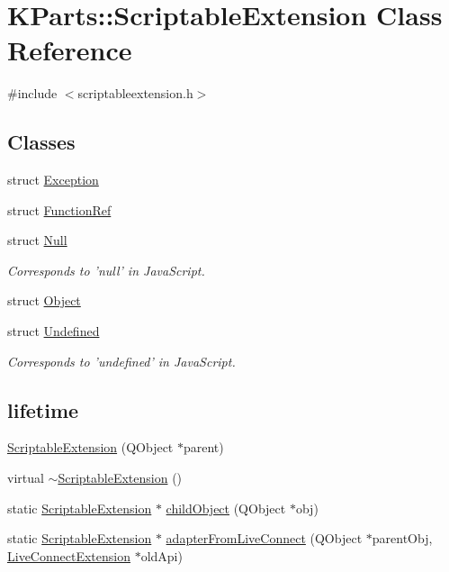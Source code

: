 \hypertarget{classKParts_1_1ScriptableExtension}{\section{\-K\-Parts\-:\-:\-Scriptable\-Extension \-Class \-Reference}
\label{classKParts_1_1ScriptableExtension}
}


{\ttfamily \#include $<$scriptableextension.\-h$>$}

\subsection*{\-Classes}
\begin{DoxyCompactItemize}
\item 
struct \hyperlink{structKParts_1_1ScriptableExtension_1_1Exception}{\-Exception}
\item 
struct \hyperlink{structKParts_1_1ScriptableExtension_1_1FunctionRef}{\-Function\-Ref}
\item 
struct \hyperlink{structKParts_1_1ScriptableExtension_1_1Null}{\-Null}
\begin{DoxyCompactList}\small\item\em \-Corresponds to 'null' in \-Java\-Script. \end{DoxyCompactList}\item 
struct \hyperlink{structKParts_1_1ScriptableExtension_1_1Object}{\-Object}
\item 
struct \hyperlink{structKParts_1_1ScriptableExtension_1_1Undefined}{\-Undefined}
\begin{DoxyCompactList}\small\item\em \-Corresponds to 'undefined' in \-Java\-Script. \end{DoxyCompactList}\end{DoxyCompactItemize}
\subsection*{lifetime}
\begin{DoxyCompactItemize}
\item 
\hyperlink{classKParts_1_1ScriptableExtension_ab5aa7a70fe1b0643b5498529e574ef76}{\-Scriptable\-Extension} (\-Q\-Object $\ast$parent)
\item 
virtual \hyperlink{classKParts_1_1ScriptableExtension_aea7c940a43c9fba7279bc4d3a1959407}{$\sim$\-Scriptable\-Extension} ()
\item 
static \hyperlink{classKParts_1_1ScriptableExtension}{\-Scriptable\-Extension} $\ast$ \hyperlink{classKParts_1_1ScriptableExtension_a03e2028b730dbe724f27d97ff6422325}{child\-Object} (\-Q\-Object $\ast$obj)
\item 
static \hyperlink{classKParts_1_1ScriptableExtension}{\-Scriptable\-Extension} $\ast$ \hyperlink{classKParts_1_1ScriptableExtension_afe1e57b7a4ec5119d0d8eefff3ba6134}{adapter\-From\-Live\-Connect} (\-Q\-Object $\ast$parent\-Obj, \hyperlink{classKParts_1_1LiveConnectExtension}{\-Live\-Connect\-Extension} $\ast$old\-Api)
\end{DoxyCompactItemize}
